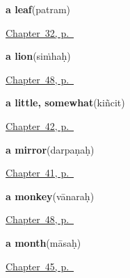 \noindent\begin{minipage}[t]{\linewidth}
\raggedright
\textbf{a leaf}\enspace\emph{}\enspace(patram)\par
\footnotesize \hyperref[ch:sa-tree]{Chapter~32, p.~\pageref*{ch:sa-tree}}
\end{minipage}\par\smallskip

\noindent\begin{minipage}[t]{\linewidth}
\raggedright
\textbf{a lion}\enspace\emph{}\enspace(siṁhaḥ)\par
\footnotesize \hyperref[ch:sa-more-animals]{Chapter~48, p.~\pageref*{ch:sa-more-animals}}
\end{minipage}\par\smallskip

\noindent\begin{minipage}[t]{\linewidth}
\raggedright
\textbf{a little, somewhat}\enspace\emph{}\enspace(kiñcit)\par
\footnotesize \hyperref[ch:sa-replies-third]{Chapter~42, p.~\pageref*{ch:sa-replies-third}}
\end{minipage}\par\smallskip

\noindent\begin{minipage}[t]{\linewidth}
\raggedright
\textbf{a mirror}\enspace\emph{}\enspace(darpaṇaḥ)\par
\footnotesize \hyperref[ch:sa-things-people-make]{Chapter~41, p.~\pageref*{ch:sa-things-people-make}}
\end{minipage}\par\smallskip

\noindent\begin{minipage}[t]{\linewidth}
\raggedright
\textbf{a monkey}\enspace\emph{}\enspace(vānaraḥ)\par
\footnotesize \hyperref[ch:sa-more-animals]{Chapter~48, p.~\pageref*{ch:sa-more-animals}}
\end{minipage}\par\smallskip

\noindent\begin{minipage}[t]{\linewidth}
\raggedright
\textbf{a month}\enspace\emph{}\enspace(māsaḥ)\par
\footnotesize \hyperref[ch:sa-times-of-the-day]{Chapter~45, p.~\pageref*{ch:sa-times-of-the-day}}
\end{minipage}\par\smallskip

